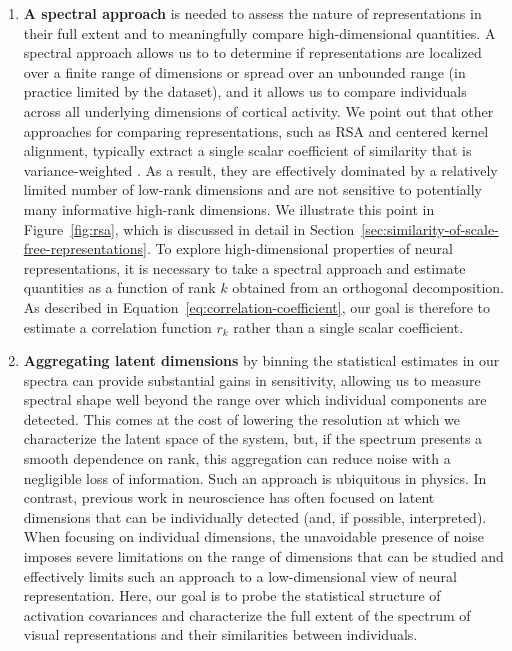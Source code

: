 \documentclass[10pt]{article}
\providecommand{\tightlist}{\setlength{\itemsep}{0pt}\setlength{\parskip}{0pt}}
\begin{document}
\begin{enumerate}
\def\labelenumi{\arabic{enumi}.}
\tightlist
\item
  \textbf{A spectral approach} is needed to assess the nature of representations in their full extent and to meaningfully compare high-dimensional quantities. A spectral approach allows us to to determine if representations are localized over a finite range of dimensions or spread over an unbounded range (in practice limited by the dataset), and it allows us to compare individuals across all underlying dimensions of cortical activity. We point out that other approaches for comparing representations, such as RSA and centered kernel alignment, typically extract a single scalar coefficient of similarity that is variance-weighted \autocite{Kriegeskorte2008,Kornblith2019}. As a result, they are effectively dominated by a relatively limited number of low-rank dimensions and are not sensitive to potentially many informative high-rank dimensions. We illustrate this point in Figure~\ref{fig:rsa}, which is discussed in detail in Section~\ref{sec:similarity-of-scale-free-representations}. To explore high-dimensional properties of neural representations, it is necessary to take a spectral approach and estimate quantities as a function of rank \(k\) obtained from an orthogonal decomposition. As described in Equation~\ref{eq:correlation-coefficient}, our goal is therefore to estimate a correlation function \(r_k\) rather than a single scalar coefficient.
\item
  \textbf{Aggregating latent dimensions} by binning the statistical estimates in our spectra can provide substantial gains in sensitivity, allowing us to measure spectral shape well beyond the range over which individual components are detected. This comes at the cost of lowering the resolution at which we characterize the latent space of the system, but, if the spectrum presents a smooth dependence on rank, this aggregation can reduce noise with a negligible loss of information. Such an approach is ubiquitous in physics. In contrast, previous work in neuroscience has often focused on latent dimensions that can be individually detected (and, if possible, interpreted). When focusing on individual dimensions, the unavoidable presence of noise imposes severe limitations on the range of dimensions that can be studied and effectively limits such an approach to a low-dimensional view of neural representation. Here, our goal is to probe the statistical structure of activation covariances and characterize the full extent of the spectrum of visual representations and their similarities between individuals.
\end{enumerate}
\end{document}
